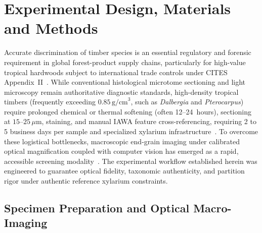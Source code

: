 \documentclass[a4paper,fleqn,12pt]{cas-sc}
\begin{document}
\section{Experimental Design, Materials and Methods}
\label{sec:methods}

Accurate discrimination of timber species is an essential regulatory and forensic requirement in global forest-product supply chains, particularly for high-value tropical hardwoods subject to international trade controls under CITES Appendix~II~\cite{dormontt2015,cites}. While conventional histological microtome sectioning and light microscopy remain authoritative diagnostic standards, high-density tropical timbers (frequently exceeding $0.85\,\text{g/cm}^3$, such as \textit{Dalbergia} and \textit{Pterocarpus}) require prolonged chemical or thermal softening (often 12--24~hours), sectioning at $15\text{--}25\,\mu\text{m}$, staining, and manual IAWA feature cross-referencing, requiring 2 to 5 business days per sample and specialized xylarium infrastructure~\cite{dormontt2015,iawa1989,wiedenhoeft2011}. To overcome these logistical bottlenecks, macroscopic end-grain imaging under calibrated optical magnification coupled with computer vision has emerged as a rapid, accessible screening modality~\cite{woodreview,ravindran2020,ravindran2022}. The experimental workflow established herein was engineered to guarantee optical fidelity, taxonomic authenticity, and partition rigor under authentic reference xylarium constraints.

\subsection{Specimen Preparation and Optical Macro-Imaging}
\end{document}
